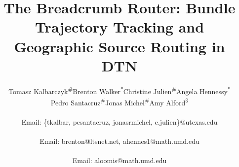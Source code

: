 \title{The Breadcrumb Router: Bundle Trajectory Tracking and Geographic Source Routing in DTN}

\author{
\alignauthor
Tomasz Kalbarczyk\textsuperscript{\#}\quad Brenton
Walker\textsuperscript{*}\quad Christine
Julien\textsuperscript{\#}\quad Angela
Hennessy\textsuperscript{*}\quad\\
Pedro
Santacruz\textsuperscript{\#}\quad Jonas Michel\textsuperscript{\#}\quad Amy
Alford\textsuperscript{\$}\quad \\  
\\
Email: \{tkalbar, pesantacruz, jonasrmichel, c.julien\}@utexas.edu\\
\\
Email: brenton@ltsnet.net, ahennes1@math.umd.edu\\
\\
Email: aloomis@math.umd.edu
}



\maketitle
